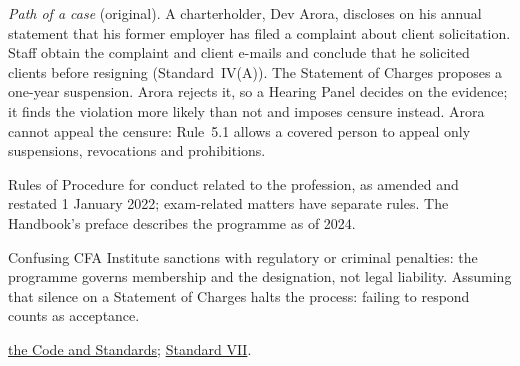 \begin{qfdefinition}
 \emph{Path of a case} (original). A charterholder, Dev Arora, discloses on his annual statement that his former employer has filed a complaint about client solicitation. Staff obtain the complaint and client e-mails and conclude that he solicited clients before resigning (Standard~IV(A)). The Statement of Charges proposes a one-year suspension. Arora rejects it, so a Hearing Panel decides on the evidence; it finds the violation more likely than not and imposes censure instead. Arora cannot appeal the censure: Rule~5.1 allows a covered person to appeal only suspensions, revocations and prohibitions.

 Rules of Procedure for conduct related to the profession, as amended and restated 1 January 2022; exam-related matters have separate rules. The Handbook's preface describes the programme as of 2024.

 Confusing CFA Institute sanctions with regulatory or criminal penalties: the programme governs membership and the designation, not legal liability. Assuming that silence on a Statement of Charges halts the process: failing to respond counts as acceptance.

 \hyperref[def:code-of-ethics-standards]{the Code and Standards}; \hyperref[rule:standard-member-responsibilities]{Standard VII}.

\end{qfdefinition}

